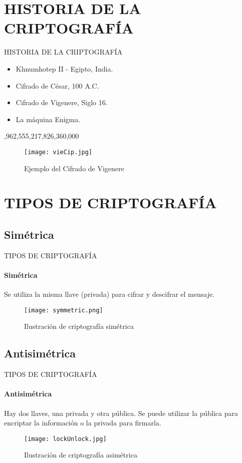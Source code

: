 \section{HISTORIA DE LA CRIPTOGRAFÍA}
\begin{frame}{HISTORIA DE LA CRIPTOGRAFÍA}
	\begin{itemize}
	\item Khnumhotep II - Egipto, India.
	\item Cifrado de César, 100 A.C.
	\item Cifrado de Vigenere, Siglo 16.
	\item La máquina Enigma.
	\end{itemize}
    ,962,555,217,826,360,000 
    \begin{figure}
    	\centering
        \texttt{[image: vieCip.jpg]}
        \caption{Ejemplo del Cifrado de Vigenere\footnotemark{}}
    \end{figure}
    \vspace{-3mm}
\end{frame}
\section{TIPOS DE CRIPTOGRAFÍA}
\subsection{Simétrica}
\begin{frame}{TIPOS DE CRIPTOGRAFÍA}
	\framesubtitle{Simétrica}
    Se utiliza la misma llave (privada) para cifrar y descifrar el mensaje.
    \begin{figure}
    	\centering
        \texttt{[image: symmetric.png]}
        \caption{Ilustración de criptografía simétrica\footnotemark{}}
    \end{figure}
    \vspace{-0.5cm}
\end{frame}
\subsection{Antisimétrica}
\begin{frame}{TIPOS DE CRIPTOGRAFÍA}
	\framesubtitle{Antisimétrica}
    Hay dos llaves, una privada y otra pública. Se puede utilizar la pública para encriptar la información o la privada para firmarla.
    \begin{figure}
    	\centering
        \texttt{[image: lockUnlock.jpg]}
        \caption{Ilustración de criptografía asimétrica\footnotemark{}}
    \end{figure}
\end{frame}
